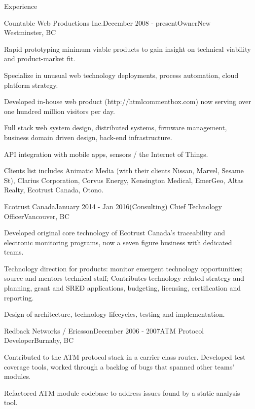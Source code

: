 \documentclass{resume} %
\begin{document}
\begin{rSection}{Experience}
\begin{rSubsection}{Countable Web Productions Inc.}{December 2008 - present}{Owner}{New Westminster, BC}
\item Rapid prototyping minimum viable products to gain insight on technical viability and product-market fit.
\item Specialize in unusual web technology deployments, process automation, cloud platform strategy.
\item Developed in-house web product (http://htmlcommentbox.com) now serving over one hundred million visitors per day.
\item Full stack web system design, distributed systems, firmware management, business domain driven design, back-end infrastructure.
\item API integration with mobile apps, sensors / the Internet of Things.
\item Clients list includes Animatic Media (with their clients Nissan, Marvel, Sesame St), Clarius Corporation, Corvus Energy, Kensington Medical, EmerGeo, Altas Realty, Ecotrust Canada, Otono.
\end{rSubsection}


\begin{rSubsection}{Ecotrust Canada}{January 2014 - Jan 2016}{(Consulting) Chief Technology Officer}{Vancouver, BC}
\item Developed original core technology of Ecotrust Canada's traceability and electronic monitoring programs, now a seven figure business with dedicated teams.
\item Technology direction for products: monitor emergent technology opportunities; source and mentors technical staff; Contributes technology related strategy and planning, grant and SRED applications, budgeting, licensing, certification and reporting.
\item Design of architecture, technology lifecycles, testing and implementation.
\end{rSubsection}


\begin{rSubsection}{Redback Networks / Ericsson}{December 2006 - 2007}{ATM Protocol Developer}{Burnaby, BC}
\item Contributed to the ATM protocol stack in a carrier class router. Developed test coverage tools, worked through a backlog of bugs that spanned other teams’ modules.
\item Refactored ATM module codebase to address issues found by a static analysis tool.


\end{rSubsection}
\end{rSection}
\end{document}
